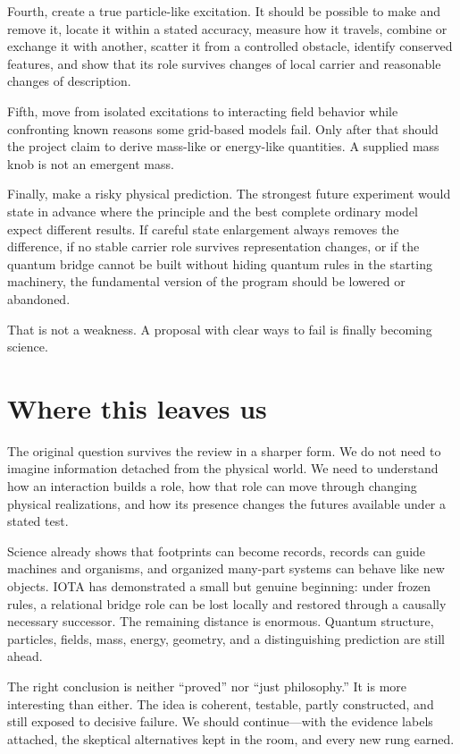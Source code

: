 \documentclass[11pt]{article}
\begin{document}
Fourth, create a true particle-like excitation. It should be possible to make
and remove it, locate it within a stated accuracy, measure how it travels,
combine or exchange it with another, scatter it from a controlled obstacle,
identify conserved features, and show that its role survives changes of local
carrier and reasonable changes of description.

Fifth, move from isolated excitations to interacting field behavior while
confronting known reasons some grid-based models fail. Only after that should
the project claim to derive mass-like or energy-like quantities. A supplied
mass knob is not an emergent mass.

Finally, make a risky physical prediction. The strongest future experiment
would state in advance where the principle and the best complete ordinary
model expect different results. If careful state enlargement always removes
the difference, if no stable carrier role survives representation changes, or
if the quantum bridge cannot be built without hiding quantum rules in the
starting machinery, the fundamental version of the program should be lowered
or abandoned.

That is not a weakness. A proposal with clear ways to fail is finally becoming
science.

\section*{Where this leaves us}

The original question survives the review in a sharper form. We do not need to
imagine information detached from the physical world. We need to understand
how an interaction builds a role, how that role can move through changing
physical realizations, and how its presence changes the futures available
under a stated test.

Science already shows that footprints can become records, records can guide
machines and organisms, and organized many-part systems can behave like new
objects. IOTA has demonstrated a small but genuine beginning: under frozen
rules, a relational bridge role can be lost locally and restored through a
causally necessary successor. The remaining distance is enormous. Quantum
structure, particles, fields, mass, energy, geometry, and a distinguishing
prediction are still ahead.

The right conclusion is neither ``proved'' nor ``just philosophy.'' It is more
interesting than either. The idea is coherent, testable, partly constructed,
and still exposed to decisive failure. We should continue---with the evidence
labels attached, the skeptical alternatives kept in the room, and every new
rung earned.



\end{document}
